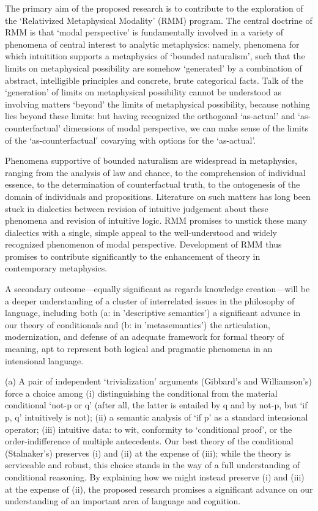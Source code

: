 
The primary aim of the proposed research is to contribute to the exploration
of the ‘Relativized Metaphysical Modality’ (RMM) program. The central doctrine
of RMM is that ‘modal perspective’ is fundamentally involved in a variety of
phenomena of central interest to analytic metaphysics: namely, phenomena for
which intuitition supports a metaphysics of ‘bounded naturalism’, such that
the limits on metaphysical possibility are somehow ‘generated’ by a
combination of abstract, intelligible principles and concrete, brute
categorical facts. Talk of the ‘generation’ of limits on metaphysical
possibility cannot be understood as involving matters ‘beyond’ the limits of
metaphysical possibility, because nothing lies beyond these limits: but having
recognized the orthogonal ‘as-actual’ and ‘as-counterfactual’ dimensions of
modal perspective, we can make sense of the limits of the ‘as-counterfactual’
covarying with options for the ‘as-actual’.

Phenomena supportive of bounded naturalism are widespread in metaphysics,
ranging from the analysis of law and chance, to the comprehension of
individual essence, to the determination of counterfactual truth, to the
ontogenesis of the domain of individuals and propositions. Literature on such
matters has long been stuck in dialectics between revision of intuitive
judgement about these phenomena and revision of intuitive logic. RMM promises
to unstick these many dialectics with a single, simple appeal to the
well-understood and widely recognized phenomenon of modal perspective.
Development of RMM thus promises to contribute significantly to the
enhancement of theory in contemporary metaphysics. 

A secondary outcome---equally significant as regards knowledge creation---will
be a deeper understanding of a cluster of interrelated issues in the
philosophy of language, including both (a: in 'descriptive semantics') a 
significant advance in our theory of conditionals and (b: in 'metasemantics’)
the articulation, modernization, and defense of an adequate framework for
formal theory of meaning, apt to represent both logical and pragmatic
phenomena in an intensional language. 

(a) A pair of independent ‘trivialization’ arguments (Gibbard’s and
Williamson’s) force a choice among (i) distinguishing the conditional from the
material conditional ‘not-p or q’ (after all, the latter is entailed by q and
by not-p, but ‘if p, q’ intuitively is not); (ii) a semantic analysis of ‘if
p’ as a standard intensional operator; (iii) intuitive data: to wit,
conformity to ‘conditional proof’, or the order-indifference of multiple
antecedents. Our best theory of the conditional (Stalnaker’s) preserves (i)
and (ii) at the expense of (iii); while the theory is serviceable and robust,
this choice stands in the way of a full understanding of conditional
reasoning. By explaining how we might instead preserve (i) and (iii) at the
expense of (ii), the proposed research promises a significant advance on our
understanding of an important area of language and cognition.

